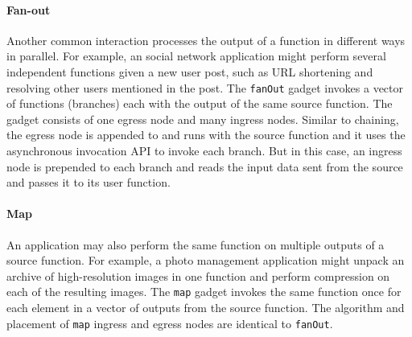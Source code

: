 \paragraph{Fan-out}
Another common interaction processes the output of a function in different
ways in parallel. For example, an social network application might perform
several independent functions given a new user post, such as URL shortening
and resolving other users mentioned in the post. The \texttt{fanOut} gadget
invokes a vector of functions (branches) each with the output of the same
source function. The gadget consists of one egress node and many ingress
nodes. Similar to chaining, the egress node is appended to and runs with the
source function and it uses the asynchronous invocation API to invoke each
branch. But in this case, an ingress node is prepended to each branch and
reads the input data sent from the source and passes it to its user function.

\paragraph{Map}
An application may also perform the same function on multiple outputs of a
source function. For example, a photo management application might unpack an
archive of high-resolution images in one function and perform compression on
each of the resulting images. The \texttt{map} gadget invokes the same
function once for each element in a vector of outputs from the source
function. The algorithm and placement of \texttt{map} ingress and egress nodes
are identical to \texttt{fanOut}.

